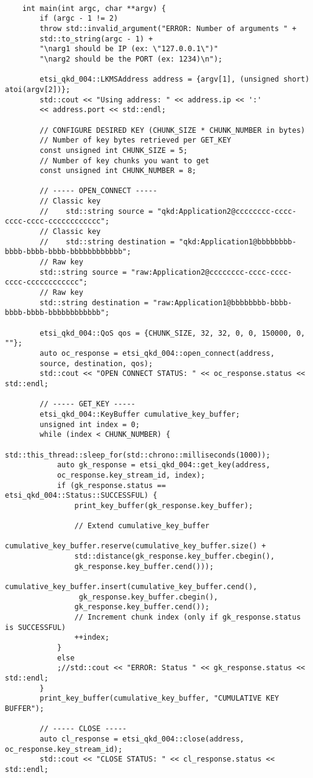\begin{refsection}
\begin{verbatim}
	
	int main(int argc, char **argv) {
		if (argc - 1 != 2)
		throw std::invalid_argument("ERROR: Number of arguments " +
		std::to_string(argc - 1) +
		"\narg1 should be IP (ex: \"127.0.0.1\")"
		"\narg2 should be the PORT (ex: 1234)\n");
		
		etsi_qkd_004::LKMSAddress address = {argv[1], (unsigned short) atoi(argv[2])};
		std::cout << "Using address: " << address.ip << ':' 
		<< address.port << std::endl;
		
		// CONFIGURE DESIRED KEY (CHUNK_SIZE * CHUNK_NUMBER in bytes)
		// Number of key bytes retrieved per GET_KEY
		const unsigned int CHUNK_SIZE = 5;  
		// Number of key chunks you want to get
		const unsigned int CHUNK_NUMBER = 8;  
		
		// ----- OPEN_CONNECT -----
		// Classic key
		//    std::string source = "qkd:Application2@cccccccc-cccc-cccc-cccc-cccccccccccc";  
		// Classic key
		//    std::string destination = "qkd:Application1@bbbbbbbb-bbbb-bbbb-bbbb-bbbbbbbbbbbb";  
		// Raw key
		std::string source = "raw:Application2@cccccccc-cccc-cccc-cccc-cccccccccccc";  
		// Raw key
		std::string destination = "raw:Application1@bbbbbbbb-bbbb-bbbb-bbbb-bbbbbbbbbbbb";  
		
		etsi_qkd_004::QoS qos = {CHUNK_SIZE, 32, 32, 0, 0, 150000, 0, ""};
		auto oc_response = etsi_qkd_004::open_connect(address, 
		source, destination, qos);
		std::cout << "OPEN CONNECT STATUS: " << oc_response.status << std::endl;
		
		// ----- GET_KEY -----
		etsi_qkd_004::KeyBuffer cumulative_key_buffer;
		unsigned int index = 0;
		while (index < CHUNK_NUMBER) {
			std::this_thread::sleep_for(std::chrono::milliseconds(1000));
			auto gk_response = etsi_qkd_004::get_key(address, 
			oc_response.key_stream_id, index);
			if (gk_response.status == etsi_qkd_004::Status::SUCCESSFUL) {
				print_key_buffer(gk_response.key_buffer);
				
				// Extend cumulative_key_buffer
				cumulative_key_buffer.reserve(cumulative_key_buffer.size() +
				std::distance(gk_response.key_buffer.cbegin(),
				gk_response.key_buffer.cend()));
				cumulative_key_buffer.insert(cumulative_key_buffer.cend(),
				 gk_response.key_buffer.cbegin(),
				gk_response.key_buffer.cend());
				// Increment chunk index (only if gk_response.status is SUCCESSFUL)
				++index;
			}
			else
			;//std::cout << "ERROR: Status " << gk_response.status << std::endl;
		}
		print_key_buffer(cumulative_key_buffer, "CUMULATIVE KEY BUFFER");
		
		// ----- CLOSE -----
		auto cl_response = etsi_qkd_004::close(address, oc_response.key_stream_id);
		std::cout << "CLOSE STATUS: " << cl_response.status << std::endl;
		

\end{verbatim}
\end{refsection}
